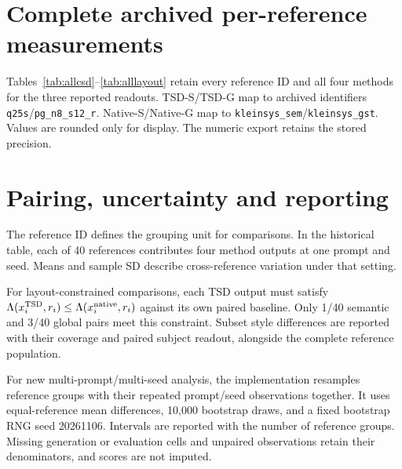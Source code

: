 \section{Complete archived per-reference measurements}
Tables~\ref{tab:allcsd}--\ref{tab:alllayout} retain every reference ID and
all four methods for the three reported readouts. TSD-S/TSD-G map to
archived identifiers \texttt{q25s}/\texttt{pg\_n8\_s12\_r}. Native-S/Native-G
map to \texttt{kleinsys\_sem}/\texttt{kleinsys\_gst}. Values are rounded
only for display. The numeric export retains the stored precision.

\begin{table}[t]
\centering\small
\caption{All archived CSD measurements, one prompt and seed 65.}
\label{tab:allcsd}
\end{table}
\begin{table}[t]
\centering\small
\caption{All archived CLIP-T measurements, one prompt and seed 65.}
\label{tab:allclip}
\end{table}
\begin{table}[t]
\centering\small
\caption{All archived reference-layout similarity measurements. Desirability
depends on the requested task. One prompt and seed 65.}
\label{tab:alllayout}
\end{table}

\section{Pairing, uncertainty and reporting}
The reference ID defines the grouping unit for comparisons. In the
historical table, each of 40 references contributes four method outputs
at one prompt and seed. Means and sample SD describe cross-reference
variation under that setting.

For layout-constrained comparisons, each TSD output must satisfy
$\Lambda(x_i^{\rm TSD},r_i)\leq\Lambda(x_i^{\rm native},r_i)$ against its
own paired baseline. Only 1/40 semantic and 3/40 global pairs meet this
constraint. Subset style differences are reported with their coverage and paired
subject readout, alongside the complete reference population.

For new multi-prompt/multi-seed analysis, the implementation resamples
reference groups with their repeated prompt/seed observations together.
It uses equal-reference mean differences, 10,000 bootstrap draws, and a
fixed bootstrap RNG seed 20261106. Intervals are reported with the number of reference groups. Missing
generation or evaluation cells and unpaired observations retain their
denominators, and scores are not imputed.

